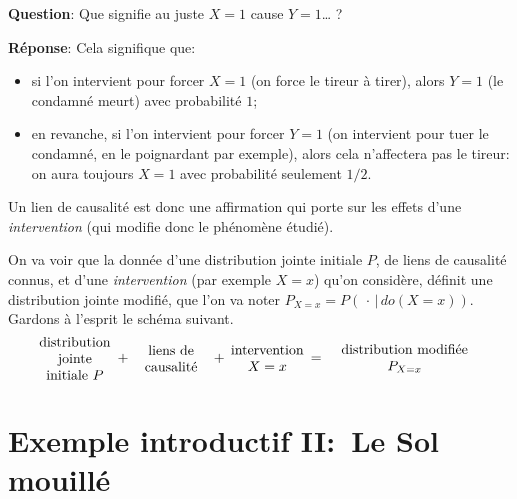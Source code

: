 \textbf{Question}: Que signifie au juste \og\(X=1\) cause \(Y=1\)\fg \ldots{} ?

\textbf{Réponse}: Cela signifique que:
\begin{itemize}
\item si l'on intervient pour forcer \(X=1\) (on force le tireur à tirer),
alors \(Y=1\) (le condamné meurt) avec probabilité \(1\);
\item en revanche, si l'on intervient pour forcer \(Y=1\) (on intervient
pour tuer le condamné, en le poignardant par exemple), alors cela
n'affectera pas le tireur: on aura toujours \(X=1\) avec probabilité seulement \(1/2\).
\end{itemize}
Un lien de causalité est donc une affirmation qui porte sur les
effets d'une \emph{intervention} (qui modifie donc le phénomène étudié).

On va voir que la donnée d'une distribution jointe initiale \(P\), de liens de
causalité connus, et d'une \emph{intervention} (par exemple \(X=x\)) qu'on considère,
définit une distribution jointe modifié, que l'on va noter \(P_{X=x}=P(\,\cdot\,|\,do(X=x))\).
Gardons à l'esprit le schéma suivant.
\[ \text{\parbox{2cm}{\centering distribution jointe initiale
$P$}}+\parbox{2cm}{\centering liens de causalité}+
\parbox{2cm}{\centering intervention $X=x$}=\parbox{4cm}{\centering
distribution modifiée $P_{X=x}$}  \]

\section{Exemple introductif II:\ Le Sol mouillé}
\label{sec:exemple-intr-ii}

